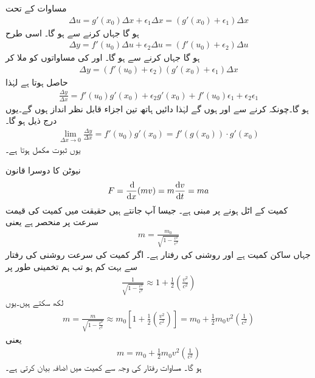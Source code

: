 مساوات  کے تحت
\begin{align*}
\Delta u=g'(x_0)\Delta x+\epsilon_1\Delta x=(g'(x_0)+\epsilon_1)\Delta x
\end{align*}
ہو گا جہاں  کرنے سے  ہو گا۔ اسی طرح
\begin{align*}
\Delta y=f'(u_0)\Delta u+\epsilon_2\Delta u=(f'(u_0)+\epsilon_2)\Delta u
\end{align*}
ہو گا جہاں  کرنے سے  ہو گا۔  اور  کی مساواتوں کو ملا کر 
\begin{align*}
\Delta y=(f'(u_0)+\epsilon_2)(g'(x_0)+\epsilon_1)\Delta x
\end{align*}
حاصل ہوتا ہے لہٰذا
\begin{align*}
\frac{\Delta y}{\Delta x}=f'(u_0)g'(x_0)+\epsilon_2g'(x_0)+f'(u_0)\epsilon_1+\epsilon_2\epsilon_1
\end{align*}
ہو گا۔چونکہ  کرنے سے  اور  ہوں گے لہٰذا دائیں ہاتھ تین اجزاء قابل نظر انداز ہوں گے۔یوں درج ذیل ہو گا۔
\begin{align*}
\lim_{\Delta x\to 0}\frac{\Delta y}{\Delta x}=f'(u_0)g'(x_0)=f'(g(x_0))\cdot g'(x_0)
\end{align*}
یوں ثبوت مکمل ہوتا ہے۔

نیوٹن کا دوسرا قانون
\begin{align*}
F=\frac{\dif}{\dif x}(mv)=m\frac{\dif v}{\dif t}=ma
\end{align*}
کمیت کے اٹل ہونے پر مبنی ہے۔ جیسا آپ جانتے ہیں حقیقت میں کمیت کی قیمت سرعت پر منحصر ہے یعنی
\begin{align*}
m=\frac{m_0}{\sqrt{1-\tfrac{v^2}{c^2}}}
\end{align*}
جہاں ساکن کمیت  ہے اور روشنی کی رفتار  ہے۔ اگر کمیت کی سرعت  روشنی کی رفتار سے بہت کم ہو تب ہم تخمینی طور پر 
\begin{align*}
\frac{1}{\sqrt{1-\tfrac{v^2}{c^2}}}\approx 1+\frac{1}{2}(\tfrac{v^2}{c^2})
\end{align*}
لکھ سکتے ہیں۔یوں
\begin{align*}
m=\frac{m}{\sqrt{1-\tfrac{v^2}{c^2}}}\approx m_0[1+\frac{1}{2}(\tfrac{v^2}{c^2})]=m_0+\frac{1}{2}m_0v^2(\tfrac{1}{c^2})
\end{align*}
یعنی
\begin{align}\label{مساوات_استعمال_کمیت_میں_اضافہ}
m=m_0+\frac{1}{2}m_0v^2(\tfrac{1}{c^2})
\end{align}
ہو گا۔ مساوات  رفتار کی وجہ سے کمیت میں اضافہ بیان کرتی ہے۔

